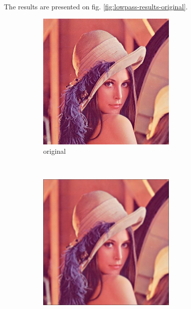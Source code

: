 \documentclass[12pt]{article}
\begin{document}
The results are presented on fig. \ref{fig:lowpass-results-original}.

\begin{figure}[h]\centering
    \begin{subfigure}[t]{.4\textwidth}
        \includegraphics[width=\textwidth]{lenac_small.png}
        \caption{original}
    \end{subfigure}\\[2ex]
    \begin{subfigure}[t]{\subfiguresize}
        \includegraphics[width=\textwidth]{lenac_lowpass1.png}

\end{subfigure}
\end{figure}
\end{document}
